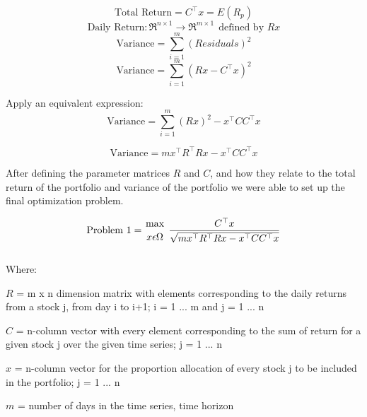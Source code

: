 \begin{equation}
\label{eqTotPortReturn}
\text{Total Return} = {{C}^\top {x}} = {E(R_p)} 
\end{equation}
\begin{equation}
\label{eqDailyReturn}
\text{Daily Return}: {\Re^{n\times1}}\to{\Re^{m\times1}} ~~ \text{defined by }{{R} {x}}
\end{equation}
\begin{equation}
\label{eqResiduals}
\text{Variance} = \sum_{i=1}^m (Residuals)^2
\end{equation}
\begin{equation}
\label{eqVariance}
\text{Variance} = \sum_{i=1}^m ({{R}{x}} - {{C}^\top {x}})^2
\end{equation}

Apply an equivalent expression:
\begin{equation}
\label{eqVarianceNew}
\text{Variance} = \sum_{i=1}^m ({R}{x})^2 - {{x}^\top{C}}{{C}^\top {x}}
\end{equation}

\begin{equation}
\label{eqVar}
\text{Variance}= m {{x}^\top{R}^\top{R}{x}} - {{x}^\top{C}}{{C}^\top {x}}
\end{equation}



After defining the parameter matrices $R$ and $C$, and how they relate to the total return of the portfolio and variance of the portfolio we were able to set up the final optimization problem.  

\begin{equation}\label{eqProb1V}
\text{Problem 1} = {{\mbox{max}}\atop{x\epsilon\Omega}} ~ \dfrac{{C}^\top{x}}{\sqrt{m {x}^\top{R}^\top{R}{x} - {x}^\top{C}{C}^\top{x}}}
\end{equation} \\[-0.6cm]

\noindent Where:

$R$ =  m x n dimension matrix with elements corresponding to the daily returns from a \indent stock j, from day i to i+1;  i = 1 ... m and j = 1 ... n

$C$ = n-column vector with every element corresponding to the sum of return for a 
\indent given stock j over the given time series;  j = 1 ... n

$x$ = n-column vector for the proportion allocation of every stock j to be included in the
\indent portfolio;  j = 1 ... n

$m$ = number of days in the time series, time horizon

